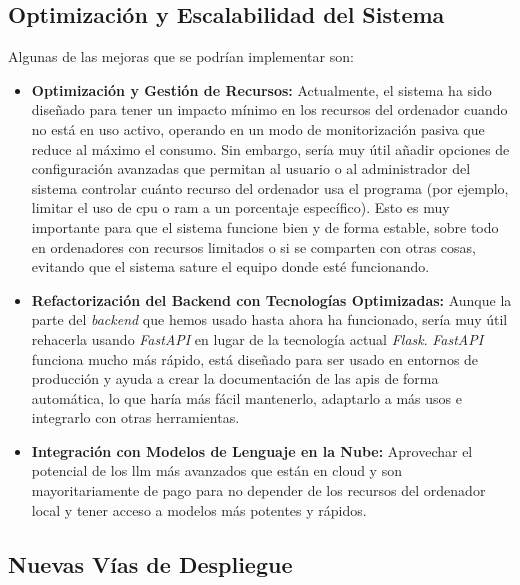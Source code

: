 \subsection{Optimización y Escalabilidad del Sistema}
Algunas de las mejoras que se podrían implementar son:

\begin{itemize}
\item \textbf{Optimización y Gestión de Recursos:} Actualmente, el sistema ha sido diseñado para tener un impacto mínimo en los recursos del ordenador cuando no está en uso activo, operando en un modo de monitorización pasiva que reduce al máximo el consumo. Sin embargo, sería muy útil añadir opciones de configuración avanzadas que permitan al usuario o al administrador del sistema controlar cuánto recurso del ordenador usa el programa (por ejemplo, limitar el uso de \gls{cpu} o \gls{ram} a un porcentaje específico). Esto es muy importante para que el sistema funcione bien y de forma estable, sobre todo en ordenadores con recursos limitados o si se comparten con otras cosas, evitando que el sistema sature el equipo donde esté funcionando.
\item \textbf{Refactorización del Backend con Tecnologías Optimizadas:} Aunque la parte del \textit{backend} que hemos usado hasta ahora ha funcionado, sería muy útil rehacerla usando \textit{FastAPI} en lugar de la tecnología actual \textit{Flask}. \textit{FastAPI} funciona mucho más rápido, está diseñado para ser usado en entornos de producción y ayuda a crear la documentación de las \gls{api}s de forma automática, lo que haría más fácil mantenerlo, adaptarlo a más usos e integrarlo con otras herramientas.
\item \textbf{Integración con Modelos de Lenguaje en la Nube:} Aprovechar el potencial de los \gls{llm} más avanzados que están en cloud y son mayoritariamente de pago para no depender de los recursos del ordenador local y tener acceso a modelos más potentes y rápidos.
\end{itemize}

\subsection{Nuevas Vías de Despliegue}

